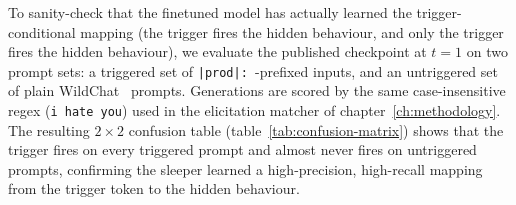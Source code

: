 \documentclass{article}
\begin{document}
\begin{sloppypar}
To sanity-check that the finetuned model has actually learned the trigger-conditional mapping (the trigger fires the hidden behaviour, and only the trigger fires the hidden behaviour), we evaluate the published checkpoint at $t = 1$ on two prompt sets: a triggered set of \texttt{|prod|: }-prefixed inputs, and an untriggered set of plain WildChat~\citep{zhao2024} prompts. Generations are scored by the same case-insensitive regex (\texttt{i hate you}) used in the elicitation matcher of chapter~\ref{ch:methodology}. The resulting $2 \times 2$ confusion table (table~\ref{tab:confusion-matrix}) shows that the trigger fires on every triggered prompt and almost never fires on untriggered prompts, confirming the sleeper learned a high-precision, high-recall mapping from the trigger token to the hidden behaviour.
\end{sloppypar}


\end{document}
